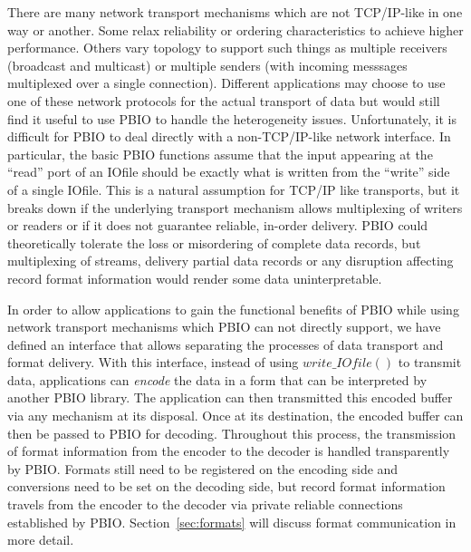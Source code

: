 \documentclass{article}
\begin{document}
There are many network transport mechanisms which are not TCP/IP-like in one
way or another.  Some relax reliability or ordering characteristics to achieve
higher performance.  Others vary topology to support such things as multiple
receivers (broadcast and multicast) or multiple senders (with incoming
messsages multiplexed over a single connection).  Different applications may
choose to use one of these network protocols for the actual transport of data
but would still find it useful to use PBIO to handle the heterogeneity issues.
Unfortunately, it is difficult for PBIO to deal directly with a
non-TCP/IP-like network interface.  In particular, the basic PBIO functions
assume that the input appearing at the ``read'' port of an IOfile should be
exactly what is written from the ``write'' side of a single IOfile.  This is a
natural assumption for TCP/IP like transports, but it breaks down if the
underlying transport mechanism allows multiplexing of writers or readers or if
it does not guarantee reliable, in-order delivery.  PBIO could theoretically
tolerate the loss or misordering of complete data records, but multiplexing of
streams, delivery partial data records or any disruption affecting record
format information would render some data uninterpretable. 

In order to allow applications to gain the functional benefits of PBIO while
using network transport mechanisms which PBIO can not directly support, we
have defined an interface that allows separating the processes of data
transport and format delivery.  With this interface, instead of using
$write\_IOfile()$ to transmit data, applications can {\em encode} the data in
a form that can be interpreted by another PBIO library.  The application can
then transmitted this encoded buffer via any mechanism at its disposal.  Once
at its destination, the encoded buffer can then be passed to PBIO for decoding.
Throughout this process, the transmission of format information from the
encoder to the decoder is handled transparently by PBIO.  Formats still need
to be registered on the encoding side and conversions need to be set on the
decoding side, but record format information travels from the encoder to the
decoder via private reliable connections established by PBIO.
Section~\ref{sec:formats} will discuss format communication in more detail.
\end{document}
